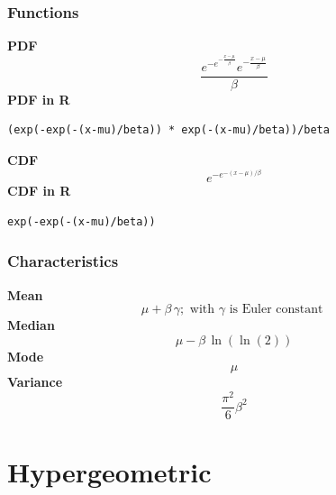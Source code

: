 \subsubsection*{Functions}

\smallskip \noindent \hspace{.2cm} \textbf{PDF} 
\begin{equation*}\frac{e^{-e^{-\frac{x-\mu}{\beta}}} e^{-\frac{x-\mu}{\beta}}}{\beta}\end{equation*}
\smallskip \noindent \hspace{.2cm} \textbf{PDF in R}  
\begin{verbatim}(exp(-exp(-(x-mu)/beta)) * exp(-(x-mu)/beta))/beta\end{verbatim}
\smallskip \noindent \hspace{.2cm} \textbf{CDF} 
\begin{equation*}e^{-e^{-(x-\mu)/\beta}}\end{equation*}
\smallskip \noindent \hspace{.2cm} \textbf{CDF in R} 
\begin{verbatim}exp(-exp(-(x-mu)/beta))\end{verbatim}
\smallskip
\subsubsection*{Characteristics}
\smallskip \noindent \hspace{.2cm} \textbf{Mean} 
\begin{equation*}\mu + \beta\,\gamma; \text{ with } \gamma \text{ is Euler constant }\end{equation*}
\smallskip \noindent \hspace{.2cm} \textbf{Median} 
\begin{equation*}\mu - \beta\,\ln(\ln(2))\end{equation*}
\smallskip \noindent \hspace{.2cm} \textbf{Mode} 
\begin{equation*}\mu\end{equation*}
\smallskip \noindent \hspace{.2cm} \textbf{Variance} 
\begin{equation*}\frac{\pi^2}{6} \beta^2\end{equation*}
\smallskip
\section*{Hypergeometric} 

  \bigskip 


